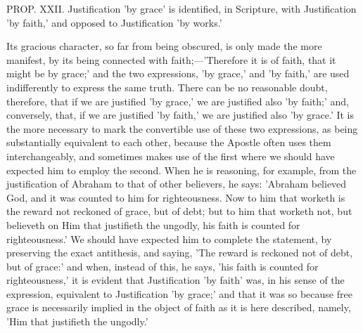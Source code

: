 \documentclass[
]{book}
\begin{document}
PROP. XXII. Justification 'by grace' is identified, in Scripture, with Justification 'by faith,' and opposed to Justification 'by works.'

Its gracious character, so far from being obscured, is only made the more manifest, by its being connected with faith;---'Therefore it is of faith, that it might be by grace;' and the two expressions, 'by grace,' and 'by faith,' are used indifferently to express the same truth. There can be no reasonable doubt, therefore, that if we are justified 'by grace,' we are justified also 'by faith;' and, conversely, that, if we are justified 'by faith,' we are justified also 'by grace.' It is the more necessary to mark the convertible use of these two expressions, as being substantially equivalent to each other, because the Apostle often uses them interchangeably, and sometimes makes use of the first where we should have expected him to employ the second. When he is reasoning, for example, from the justification of Abraham to that of other believers, he says: 'Abraham believed God, and it was counted to him for righteousness. Now to him that worketh is the reward not reckoned of grace, but of debt; but to him that worketh not, but believeth on Him that justifieth the ungodly, his faith is counted for righteousness.' We should have expected him to complete the statement, by preserving the exact antithesis, and saying, 'The reward is reckoned not of debt, but of grace:' and when, instead of this, he says, 'his faith is counted for righteousness,' it is evident that Justification 'by faith' was, in his sense of the expression, equivalent to Justification 'by grace;' and that it was so because free grace is necessarily implied in the object of faith as it is here described, namely, 'Him that justifieth the ungodly.'
\end{document}
